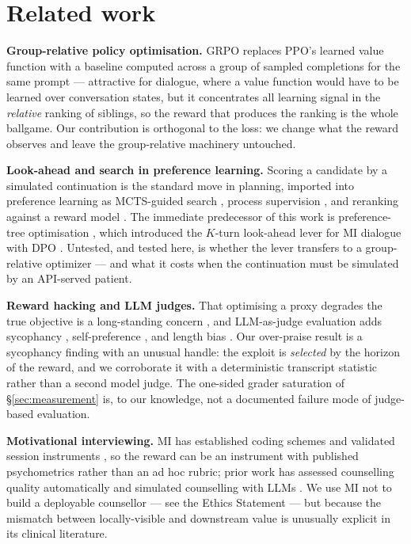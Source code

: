 \section{Related work}
\label{sec:related}

\textbf{Group-relative policy optimisation.} GRPO \citep{shao2024deepseekmath} replaces PPO's
learned value function \citep{schulman2017ppo, ouyang2022instructgpt} with a baseline computed
across a group of sampled completions for the same prompt --- attractive for dialogue, where a
value function would have to be learned over conversation states, but it concentrates all learning
signal in the \emph{relative} ranking of siblings, so the reward that produces the ranking is the
whole ballgame. Our contribution is orthogonal to the loss: we change what the reward observes and
leave the group-relative machinery untouched.

\textbf{Look-ahead and search in preference learning.} Scoring a candidate by a simulated
continuation is the standard move in planning, imported into preference learning as MCTS-guided
search \citep{yu2023promptmcts, xie2024mctsdpo}, process supervision \citep{lightman2024letsverify},
and reranking against a reward model \citep{pace2024westofn}. The immediate predecessor of this
work is preference-tree optimisation \citep{baruch2025pto}, which introduced the $K$-turn
look-ahead lever for MI dialogue with DPO \citep{rafailov2023dpo}. Untested, and tested here, is
whether the lever transfers to a group-relative optimizer --- and what it costs when the
continuation must be simulated by an API-served patient.

\textbf{Reward hacking and LLM judges.} That optimising a proxy degrades the true objective is a
long-standing concern \citep{amodei2016concrete, skalse2022defining, pan2022effects, gao2023scaling},
and LLM-as-judge evaluation \citep{zheng2023judging} adds sycophancy \citep{sharma2024sycophancy,
perez2023discovering}, self-preference \citep{panickssery2024selfpreference}, and length bias
\citep{singhal2024long, dubois2024lengthcontrolled}. Our over-praise result is a sycophancy finding
with an unusual handle: the exploit is \emph{selected} by the horizon of the reward, and we
corroborate it with a deterministic transcript statistic rather than a second model judge. The
one-sided grader saturation of \S\ref{sec:measurement} is, to our knowledge, not a documented
failure mode of judge-based evaluation.

\textbf{Motivational interviewing.} MI \citep{miller1991mi} has established coding schemes
\citep{moyers2016miti} and validated session instruments \citep{hatcher2006waisr, larsen1979csq},
so the reward can be an instrument with published psychometrics rather than an ad hoc rubric;
prior work has assessed counselling quality automatically \citep{perezrosas2019goodcounselor,
yosef2024assessing} and simulated counselling with LLMs \citep{steenstra2025scaffolding,
chen2025broaden}. We use MI not to build a deployable counsellor --- see the Ethics Statement ---
but because the mismatch between locally-visible and downstream value is unusually explicit in its
clinical literature.
